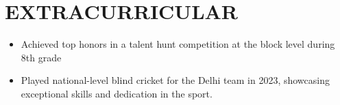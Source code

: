 \documentclass[letterpaper,11pt]{article}
\makeatletter
\newcommand{\resumeItem}[1]{
  \item\small{
    {#1 \vspace{-2pt}}
  }
}
\newcommand{\resumeSubheading}[4]{
  \vspace{-2pt}\item
    \begin{tabular*}{1.0\textwidth}[t]{l@{\extracolsep{\fill}}r}
      \textbf{\large#1} & \textbf{\small #2} \\
      \textit{\large#3} & \textit{\small #4} \\
      
    \end{tabular*}\vspace{-7pt}
}
\newcommand{\resumeSubHeadingListStart}{\begin{itemize}[leftmargin=0.0in, label={}]}
\newcommand{\resumeSubHeadingListEnd}{\end{itemize}}
\newcommand{\resumeItemListStart}{\begin{itemize}}
\newcommand{\resumeItemListEnd}{\end{itemize}\vspace{-5pt}}
\makeatother
\begin{document}
 \section{EXTRACURRICULAR}
    \resumeSubHeadingListStart
        
            \resumeItemListStart
                \resumeItem{\normalsize{Achieved top honors in a talent hunt competition at the block level during 8th grade}}
                
                \resumeItem{\normalsize{Played national-level blind cricket for the Delhi team in 2023, showcasing exceptional skills and dedication in the sport. }}
            \resumeItemListEnd
    \resumeSubHeadingListEnd
 \vspace{-11pt}
 
 
\end{document}
